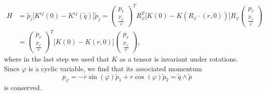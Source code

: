 \documentclass[a4paper,11pt]{article}
\begin{document}
\begin{equation*}
  \begin{aligned}
  H &= \tilde{p}_i \big[ K^{ij}(0) - K^{ij}(\tilde{q}) \big] \tilde{p}_j
     = \begin{pmatrix} p_r \\ \frac{p_\varphi}{r} \end{pmatrix}^T R_\varphi^T
       \big[ K(0) - K(R_\varphi\cdot(r,0)) \big] R_\varphi
       \begin{pmatrix} p_r \\ \frac{p_\varphi}{r} \end{pmatrix}\\
    &= \begin{pmatrix} p_r \\ \frac{p_\varphi}{r} \end{pmatrix}^T
       \big[ K(0) - K(r,0) \big] \begin{pmatrix} p_r \\ \frac{p_\varphi}{r} \end{pmatrix},
  \end{aligned}
\end{equation*}
where in the last step we used that $K$ as a tensor is invariant under
rotations. Since $\varphi$ is a cyclic variable, we find that its
associated momentum
\begin{equation*}
  p_\varphi = -r \sin(\varphi) \tilde{p}_1 + r \cos(\varphi) \tilde{p}_2
            = \tilde{q} \wedge \tilde{p}
\end{equation*}
is conserved.
\end{document}
